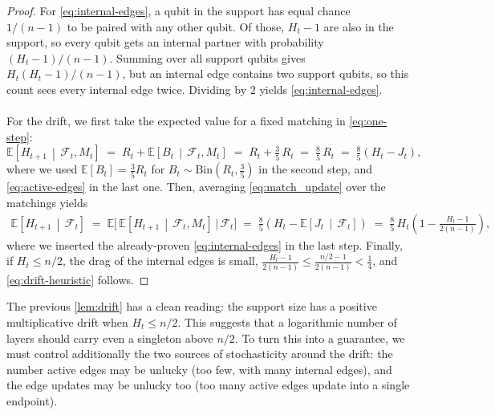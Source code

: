\documentclass[
    aps,
    superscriptaddress,
    onecolumn,
    10pt,
    prx,
    nofootinbib
]{revtex4-2}
\theoremstyle{namedstatement}
\theoremstyle{plain}
\begin{document}
\begin{proof}
For \cref{eq:internal-edges}, a qubit in the support has equal chance $1/(n-1)$ to be paired with any other qubit. Of those, $H_t-1$ are also in the support, so every qubit gets an internal partner with probability $(H_t-1)/(n-1)$. Summing over all support qubits gives $H_t(H_t-1)/(n-1)$, but an internal edge contains two support qubits, so this count sees every internal edge twice. Dividing by 2 yields \cref{eq:internal-edges}.
\\
\\
For the drift, we first take the expected value for a fixed matching in \cref{eq:one-step}:
\begin{equation} \label{eq:match_update}
    \mathbb{E}\!\left[ H_{t+1} \,\middle|\, \mathcal{F}_t, M_t \right]
    \;=\; R_t + \mathbb{E}\!\left[ B_t \,\middle|\, \mathcal{F}_t, M_t \right]
    \;=\; R_t + \tfrac{3}{5}\, R_t
    \;=\; \tfrac{8}{5}\, R_t
    \;=\; \tfrac{8}{5} \left( H_t - J_t \right),
\end{equation}
where we used $\mathbb{E}[B_t]=\frac{3}{5}R_t$ for $B_t \sim \mathrm{Bin}\!\left(R_t , \tfrac{3}{5}\right)$ in the second step, and \cref{eq:active-edges} in the last one. Then, averaging \cref{eq:match_update} over the matchings yields
\begin{align}
    \mathbb{E}\!\left[ H_{t+1} \,\middle|\, \mathcal{F}_t \right]
    \;=\; \mathbb{E}\Big[\, \mathbb{E}\!\left[ H_{t+1} \,\middle|\, \mathcal{F}_t, M_t \right] \,\Big|\, \mathcal{F}_t \Big]
    \;=\; \tfrac{8}{5} \left( H_t - \mathbb{E}\!\left[ J_t \,\middle|\, \mathcal{F}_t \right] \right)
    \;=\; \tfrac{8}{5}\, H_t \left( 1 - \frac{H_t - 1}{2(n-1)} \right), \label{eq:drift}
\end{align}
where we inserted the already-proven \cref{eq:internal-edges} in the last step. Finally, if $H_t \leq n/2$, the drag of the internal edges is small, $\frac{H_t - 1}{2(n-1)} \leq \frac{n/2 - 1}{2(n-1)} < \frac{1}{4}$, and \cref{eq:drift-heuristic} follows.
\end{proof}
The previous \cref{lem:drift} has a clean reading: the support size has a positive multiplicative drift when $H_t\leq n/2$. This suggests that a logarithmic number of layers should carry even a singleton above $n/2$. To turn this into a guarantee, we must control additionally the two sources of stochasticity around the drift: the number active edges may be unlucky (too few, with many internal edges), and the edge updates may be unlucky too (too many active edges update into a single endpoint).
\end{document}
